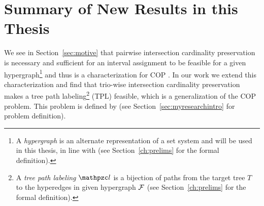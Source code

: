 \section[Summary of new results]{Summary of New Results in this Thesis}
\label{sec:results}

We see in Section~\ref{sec:motive} that pairwise intersection
cardinality preservation is necessary and sufficient for an interval
assignment to be feasible for a given hypergraph\footnote{A {\em
    hypergraph} is an alternate representation of a set system and
  will be used in this thesis, in line with \cite{kklv10} (see
  Section~\ref{ch:prelims} for the formal definition).} and thus is a
characterization for COP \cite{nsnrs09}. In our work we extend this
characterization and find that trio-wise intersection cardinality
preservation makes a tree path labeling\footnote{A {\em tree path
    labeling} $\cl$ is a bijection of paths from the target tree $T$
  to the hyperedges in given hypergraph ${\cal F}$ (see
  Section~\ref{ch:prelims} for the formal
  definition).}%
(TPL) feasible, which is a generalization of the COP problem. This
problem is defined by \FTPL (see Section~\ref{sec:myresearchintro} for
problem definition). %


